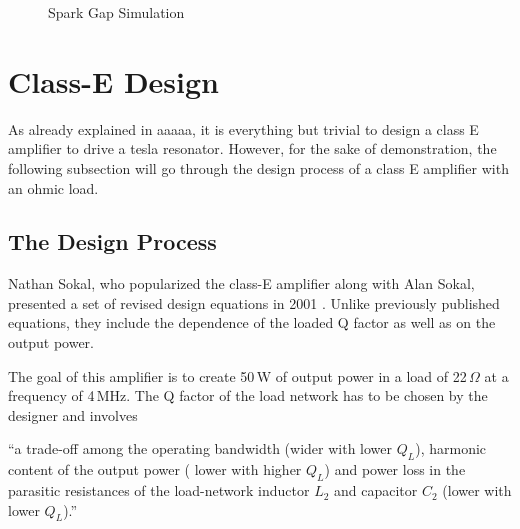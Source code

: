\begin{figure}[h!]
    \centering
    \caption{Spark Gap Simulation}
    \label{fig:spark-gap-simulation}
\end{figure}

\section{Class-E Design}

As already explained in aaaaa, it is everything but trivial to design a class E amplifier to drive a tesla resonator. However, for the sake of demonstration, the following subsection will go through the design process of a class E amplifier with an ohmic load.

\subsection{The Design Process}

Nathan Sokal, who popularized the class-E amplifier along with Alan Sokal, presented a set of revised design equations in 2001 . Unlike previously published equations, they include the dependence of the loaded Q factor as well as on the output power.

The goal of this amplifier is to create 50\,W of output power in a load of 22\,\(\Omega\) at a frequency of 4\,MHz. The Q factor of the load network has to be chosen by the designer and involves 

\begin{displayquote}
\enquote{a trade-off among the operating bandwidth (wider with lower \(Q_L\)), harmonic content of the output power (\textelp{} lower with higher \(Q_L\)) and power loss in the parasitic resistances of the load-network inductor \(L_2\) and capacitor \(C_2\) (lower with lower \(Q_L\)).}
\end{displayquote}

